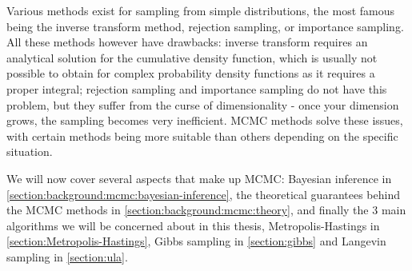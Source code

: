 \documentclass[12pt]{memoir}
\begin{document}
Various methods exist for sampling from simple distributions, the most famous being the inverse transform method, rejection sampling, or importance sampling. All these methods however have drawbacks: inverse transform requires an analytical solution for the cumulative density function, which is usually not possible to obtain for complex probability density functions as it requires a proper integral; rejection sampling and importance sampling do not have this problem, but they suffer from the curse of dimensionality - once your dimension grows, the sampling becomes very inefficient. MCMC methods solve these issues, with certain methods being more suitable than others depending on the specific situation.\medbreak

We will now cover several aspects that make up MCMC: Bayesian inference in \ref{section:background:mcmc:bayesian-inference}, the theoretical guarantees behind the MCMC methods in \ref{section:background:mcmc:theory}, and finally the 3 main algorithms we will be concerned about in this thesis, Metropolis-Hastings in \ref{section:Metropolis-Hastings}, Gibbs sampling in \ref{section:gibbs} and Langevin sampling in \ref{section:ula}.
\end{document}
